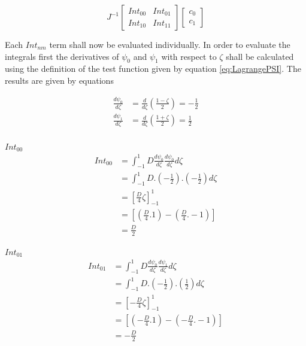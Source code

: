 \documentclass[11pt]{article}
\begin{document}
\begin{equation}
J^{-1}
\begin{bmatrix}

Int_{00} & Int_{01} \\
Int_{10} & Int_{11}
\end{bmatrix}
\begin{bmatrix}

c_{0} \\  c_{1} 
\end{bmatrix}
\end{equation}

\pagebreak
Each $Int_{nm}$ term shall now be evaluated individually. In order to evaluate the integrals first the  derivatives of $\psi_0$ and $\psi_{1}$ with respect to $\zeta$ shall be calculated using the definition of the test function given by equation \ref{eq:LagrangePSI}. The results are given by equations 

\begin{subequations}
\label{eq:prematrix}
\begin{align}
\frac{d\psi_{0}}{d\zeta} &= \frac{d}{d\zeta}(\frac{1-\zeta}{2}) = -\frac{1}{2} \label{eq:psi0der}\\
\frac{d\psi_{1}}{d\zeta} &= \frac{d}{d\zeta}(\frac{1+\zeta}{2}) = \frac{1}{2} \label{eq:psi1der}
\end{align}
\end{subequations}
\\


\underline{$Int_{00}$} \\


\begin{equation}\label{eq:Int00}
\begin{split}
 Int_{00} &= \int_{-1}^{1} D \frac{d\psi_{0}}{d\zeta} \frac{d\psi_{0}}{d \zeta} d \zeta \\
&=  \int_{-1}^{1} D .( -\frac{1}{2}). (-\frac{1}{2}) d\zeta \\
& = \left[ \frac{D}{4} \zeta \right]_{-1}^{1} \\
& = \left[ (\frac{D}{4}.1) - (\frac{D}{4}.-1) \right] \\
& = \frac{D}{2}
\end{split}
\end{equation}

\underline{$Int_{01}$} \\


\begin{equation}\label{eq:Int01}
\begin{split}
 Int_{01} &= \int_{-1}^{1} D \frac{d\psi_{0}}{d\zeta} \frac{d\psi_{1}}{d \zeta} d \zeta \\
&=  \int_{-1}^{1} D .( -\frac{1}{2}). (\frac{1}{2}) d\zeta \\
& = \left[-\frac{D}{4} \zeta \right]_{-1}^{1} \\
& = \left[ (-\frac{D}{4}.1) - (-\frac{D}{4}.-1) \right] \\
& = -\frac{D}{2}
\end{split}
\end{equation}
\end{document}
